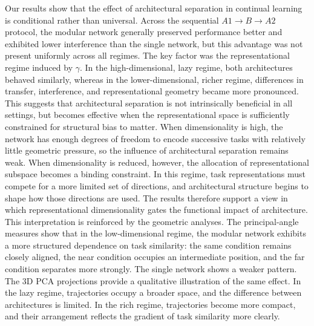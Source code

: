 \documentclass[letterpaper]{article}
\begin{document}
        Our results show that the effect of architectural separation in continual learning is conditional rather than universal. Across the sequential $A1 \rightarrow B \rightarrow A2$ protocol, the modular network generally preserved performance better and exhibited lower interference than the single network, but this advantage was not present uniformly across all regimes. The key factor was the representational regime induced by $\gamma$. In the high-dimensional, lazy regime, both architectures behaved similarly, whereas in the lower-dimensional, richer regime, differences in transfer, interference, and representational geometry became more pronounced. This suggests that architectural separation is not intrinsically beneficial in all settings, but becomes effective when the representational space is sufficiently constrained for structural bias to matter. 
        When dimensionality is high, the network has enough degrees of freedom to encode successive tasks with relatively little geometric pressure, so the influence of architectural separation remains weak. When dimensionality is reduced, however, the allocation of representational subspace becomes a binding constraint. In this regime, task representations must compete for a more limited set of directions, and architectural structure begins to shape how those directions are used. The results therefore support a view in which representational dimensionality gates the functional impact of architecture. This interpretation is reinforced by the geometric analyses. The principal-angle measures show that in the low-dimensional regime, the modular network exhibits a more structured dependence on task similarity: the same condition remains closely aligned, the near condition occupies an intermediate position, and the far condition separates more strongly. The single network shows a weaker pattern. The 3D PCA projections provide a qualitative illustration of the same effect. In the lazy regime, trajectories occupy a broader space, and the difference between architectures is limited. In the rich regime, trajectories become more compact, and their arrangement reflects the gradient of task similarity more clearly.
        
\end{document}
